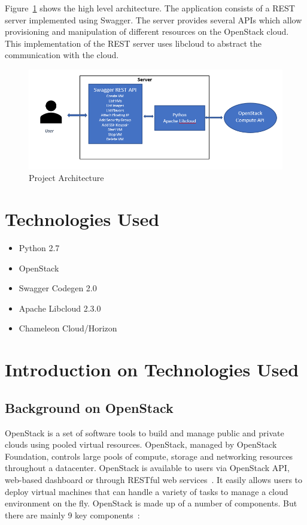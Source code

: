 Figure~\ref{fig:project-architecture} shows the high level architecture. The 
application consists of a REST server implemented using Swagger. The server
provides several APIs which allow provisioning and manipulation of different
resources on the OpenStack cloud. This implementation of the REST server uses 
libcloud to abstract the communication with the cloud. 

\begin{figure}[!ht]
        \centering\includegraphics[width=\columnwidth]
        {images/proj-architecture.png}
        \caption{Project Architecture}
        \label{fig:project-architecture}
\end{figure}

\section{Technologies Used}
\begin{itemize}
\item Python 2.7
\item OpenStack 
\item Swagger Codegen 2.0
\item Apache Libcloud 2.3.0
\item Chameleon Cloud/Horizon
\end{itemize}

\section{Introduction on Technologies Used}

\subsection{Background on OpenStack}
OpenStack is a set of software tools to build and manage public and private
clouds using pooled virtual resources. OpenStack, managed by OpenStack
Foundation, controls large pools of compute, storage and networking resources
throughout a datacenter. OpenStack is available to users via OpenStack API,
web-based dashboard or through RESTful web
services~\cite{hid-sp18-516-www-wiki-openstack}. It easily allows users to
deploy virtual machines that can handle a variety of tasks to manage a cloud
environment on the fly. OpenStack is made up of a number of components. But
there are mainly 9 key components~\cite{hid-sp18-516-www-opensource}:

